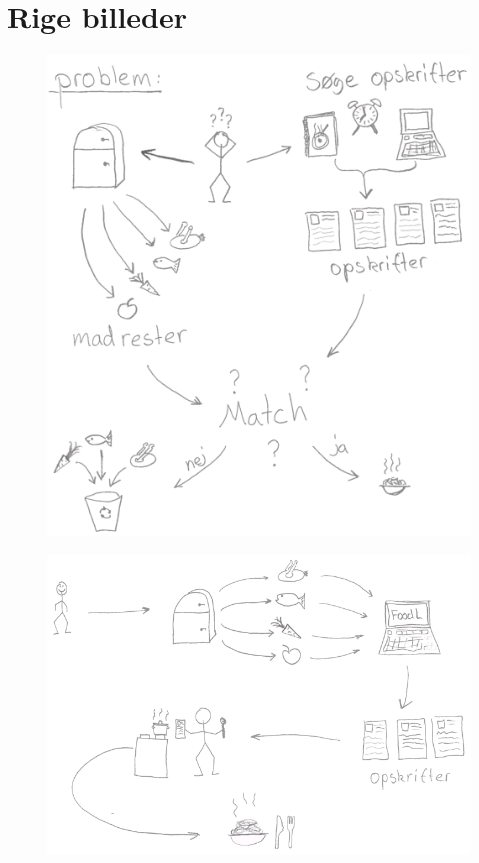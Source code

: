 \chapter{Rige billeder}
\label{ap:rigebilleder}

\begin{figure}[H]
\centering
\includegraphics[scale=0.7]{billeder/rigebilleder/problemomraade.png}
\label{fig:rigbillede_po}
\end{figure}

\begin{figure}[H]
\centering
\includegraphics[scale=0.7]{billeder/rigebilleder/anvendelsesomraade.png}
\label{fig:rigbillede_ao}
\end{figure}
